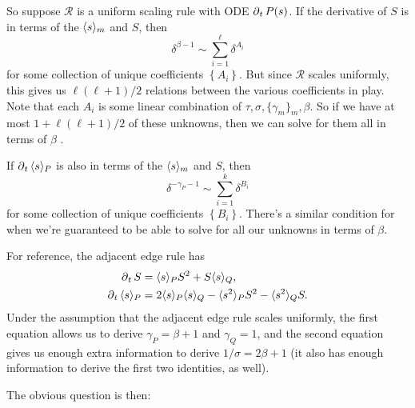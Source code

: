 \documentclass[twoside,10pt]{report}
\begin{document}
So suppose $\mathcal{R}$ is a uniform scaling rule with ODE $\operatorname{\partial}_{t}{P}(s) $. If the derivative of $S$ is in terms of the $\langle s \rangle_{m}$ and $S$, then
\[
	\delta^{\beta-1} \sim \sum_{i=1}^{\ell} \delta^{A_i}
\] for some collection of unique coefficients $\left\{ A_i \right\}$. But since $\mathcal{R}$ scales uniformly, this gives us $\ell(\ell+1)/2$ relations between the various coefficients in play. Note that each $A_i$ is some linear combination of $\tau, \sigma, \{\gamma_{m}\}_m, \beta$. So if we have at most $1 + \ell(\ell+1)/2$ of these unknowns, then we can solve for them all in terms of $\beta$ .

If $\operatorname{\partial}_{t}{\langle s \rangle_{P}} $ is also in terms of the $\langle s \rangle_{m}$ and $S$, then
\[
\delta^{-\gamma_{P}-1} \sim \sum_{i=1}^{k} \delta^{B_{i}}
\] for some collection of unique coefficients $\left\{ B_i \right\}$. There's a similar condition for when we're guaranteed to be able to solve for all our unknowns in terms of $\beta$.

\begin{ex}
For reference, the adjacent edge rule has
\begin{align*}
	\operatorname{\partial}_{t}{S} &= \langle s \rangle_{P}S^2 + S\langle s \rangle_{Q}, \\
	\operatorname{\partial}_{t}{\langle s \rangle_{P}} &= 2\langle s \rangle_{P}\langle s \rangle_{Q} - \langle s^2 \rangle_{P}S^2 - \langle s^2 \rangle_{Q}S.
\end{align*}
Under the assumption that the adjacent edge rule scales uniformly, the first equation allows us to derive $\gamma_{P}=\beta+1$ and $\gamma_{Q}=1$, and the second equation gives us enough extra information to derive $1/\sigma = 2\beta+1$ (it also has enough information to derive the first two identities, as well).
\end{ex}

The obvious question is then: 
\end{document}
